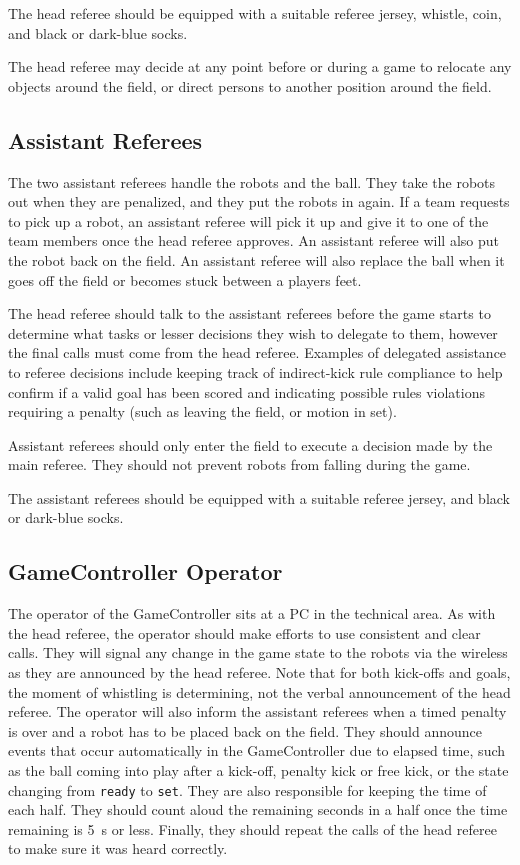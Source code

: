 The head referee should be equipped with a suitable referee jersey, whistle, coin, and black or dark-blue socks.

The head referee may decide at any point before or during a game to relocate any objects around the field, or direct persons to another position around the field.

\subsection{Assistant Referees}
\label{sec:assist_referee}

The two assistant referees handle the robots and the ball.
They take the robots out when they are penalized, and they put the robots in again.
If a team requests to pick up a robot, an assistant referee will pick it up and give it to one of the team members once the head referee approves.
An assistant referee will also put the robot back on the field.
An assistant referee will also replace the ball when it goes off the field or becomes stuck between a players feet.

The head referee should talk to the assistant referees before the game starts to determine what tasks or lesser decisions they wish to delegate to them, however the final calls must come from the head referee.
Examples of delegated assistance to referee decisions include keeping track of indirect-kick rule compliance to help confirm if a valid goal has been scored and indicating possible rules violations requiring a penalty (such as leaving the field, or motion in set).

Assistant referees should only enter the field to execute a decision made by the main referee.
They should not prevent robots from falling during the game.

The assistant referees should be equipped with a suitable referee jersey, and black or dark-blue socks.

\subsection{GameController Operator}
\label{sec:gameControllerOp}

The operator of the GameController sits at a PC in the technical area.
As with the head referee, the operator should make efforts to use consistent and clear calls.
They will signal any change in the game state to the robots via the wireless as they are announced by the head referee.
Note that for both kick-offs and goals, the moment of whistling is determining, not the verbal announcement of the head referee.
The operator will also inform the assistant referees when a timed penalty is over and a robot has to be placed back on the field.
They should announce events that occur automatically in the GameController due to elapsed time, such as the ball coming into play after a kick-off, penalty kick or free kick, or the state changing from \texttt{ready} to \texttt{set}.
They are also responsible for keeping the time of each half.
They should count aloud the remaining seconds in a half once the time remaining is \qty{5}{\second} or less.
Finally, they should repeat the calls of the head referee to make sure it was heard correctly.

